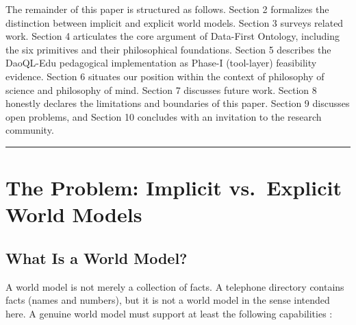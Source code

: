 \documentclass[11pt,a4paper]{article}
\begin{document}
The remainder of this paper is structured as follows. Section 2
formalizes the distinction between implicit and explicit world models.
Section 3 surveys related work. Section 4 articulates the core argument
of Data-First Ontology, including the six primitives and their
philosophical foundations. Section 5 describes the DaoQL-Edu pedagogical
implementation as Phase-I (tool-layer) feasibility evidence. Section 6
situates our position within the context of philosophy of science and
philosophy of mind. Section 7 discusses future work. Section 8 honestly
declares the limitations and boundaries of this paper. Section 9
discusses open problems, and Section 10 concludes with an invitation to
the research community.

\begin{center}\rule{0.5\linewidth}{0.5pt}\end{center}

\section{The Problem: Implicit vs.~Explicit World
Models}\label{the-problem-implicit-vs.-explicit-world-models}

\subsection{What Is a World Model?}\label{what-is-a-world-model}

A world model is not merely a collection of facts. A telephone directory
contains facts (names and numbers), but it is not a world model in the
sense intended here. A genuine world model must support at least the
following capabilities \cite{ha2018,lecun2022}:
\end{document}
